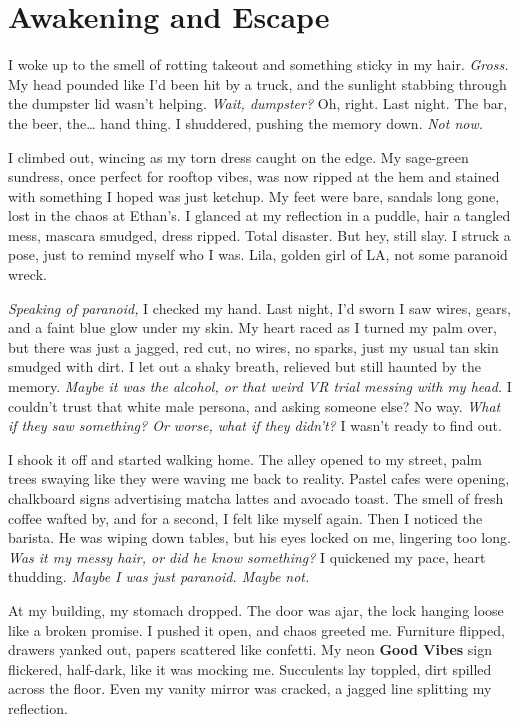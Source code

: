 \documentclass[12pt,oneside]{book}
\begin{document}
\chapter{Awakening and Escape}

I woke up to the smell of rotting takeout and something sticky in my hair. \textit{Gross.} My head pounded like I’d been hit by a truck, and the sunlight stabbing through the dumpster lid wasn’t helping. \textit{Wait, dumpster?} Oh, right. Last night. The bar, the beer, the… hand thing. I shuddered, pushing the memory down. \textit{Not now.}

I climbed out, wincing as my torn dress caught on the edge. My sage-green sundress, once perfect for rooftop vibes, was now ripped at the hem and stained with something I hoped was just ketchup. My feet were bare, sandals long gone, lost in the chaos at Ethan’s. I glanced at my reflection in a puddle, hair a tangled mess, mascara smudged, dress ripped. Total disaster. But hey, still slay. I struck a pose, just to remind myself who I was. Lila, golden girl of LA, not some paranoid wreck.

\textit{Speaking of paranoid,} I checked my hand. Last night, I’d sworn I saw wires, gears, and a faint blue glow under my skin. My heart raced as I turned my palm over, but there was just a jagged, red cut, no wires, no sparks, just my usual tan skin smudged with dirt. I let out a shaky breath, relieved but still haunted by the memory. \textit{Maybe it was the alcohol, or that weird VR trial messing with my head.} I couldn’t trust that white male persona, and asking someone else? No way. \textit{What if they saw something? Or worse, what if they didn’t?} I wasn’t ready to find out.

I shook it off and started walking home. The alley opened to my street, palm trees swaying like they were waving me back to reality. Pastel cafes were opening, chalkboard signs advertising matcha lattes and avocado toast. The smell of fresh coffee wafted by, and for a second, I felt like myself again. Then I noticed the barista. He was wiping down tables, but his eyes locked on me, lingering too long. \textit{Was it my messy hair, or did he know something?} I quickened my pace, heart thudding. \textit{Maybe I was just paranoid. Maybe not.}

At my building, my stomach dropped. The door was ajar, the lock hanging loose like a broken promise. I pushed it open, and chaos greeted me. Furniture flipped, drawers yanked out, papers scattered like confetti. My neon \textbf{Good Vibes} sign flickered, half-dark, like it was mocking me. Succulents lay toppled, dirt spilled across the floor. Even my vanity mirror was cracked, a jagged line splitting my reflection.
\end{document}
